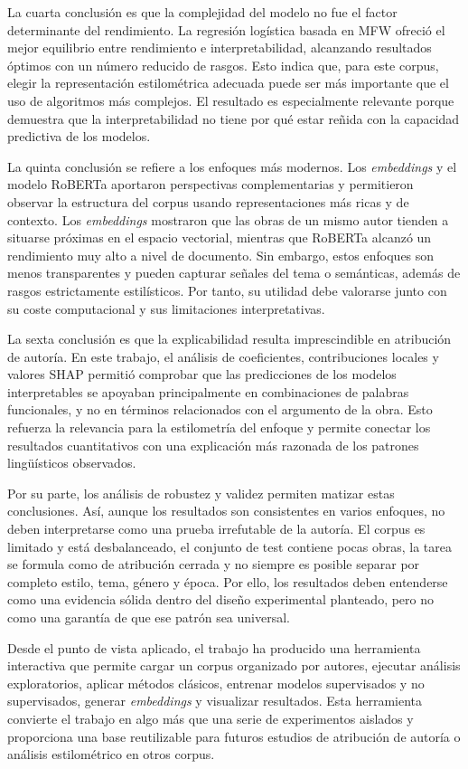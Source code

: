 \documentclass[IB]{TFUOC}%
\begin{document}
La cuarta conclusión es que la complejidad del modelo no fue el factor determinante del rendimiento. La regresión logística basada en MFW ofreció el mejor equilibrio entre rendimiento e interpretabilidad, alcanzando resultados óptimos con un número reducido de rasgos. Esto indica que, para este corpus, elegir la representación estilométrica adecuada puede ser más importante que el uso de algoritmos más complejos. El resultado es especialmente relevante porque demuestra que la interpretabilidad no tiene por qué estar reñida con la capacidad predictiva de los modelos.

La quinta conclusión se refiere a los enfoques más modernos. Los \textit{embeddings} y el modelo RoBERTa aportaron perspectivas complementarias y permitieron observar la estructura del corpus usando representaciones más ricas y de contexto. Los \textit{embeddings} mostraron que las obras de un mismo autor tienden a situarse próximas en el espacio vectorial, mientras que RoBERTa alcanzó un rendimiento muy alto a nivel de documento. Sin embargo, estos enfoques son menos transparentes y pueden capturar señales del tema o semánticas, además de rasgos estrictamente estilísticos. Por tanto, su utilidad debe valorarse junto con su coste computacional y sus limitaciones interpretativas.

La sexta conclusión es que la explicabilidad resulta imprescindible en atribución de autoría. En este trabajo, el análisis de coeficientes, contribuciones locales y valores SHAP permitió comprobar que las predicciones de los modelos interpretables se apoyaban principalmente en combinaciones de palabras funcionales, y no en términos relacionados con el argumento de la obra. Esto refuerza la relevancia para la estilometría del enfoque y permite conectar los resultados cuantitativos con una explicación más razonada de los patrones lingüísticos observados.

Por su parte, los análisis de robustez y validez permiten matizar estas conclusiones. Así, aunque los resultados son consistentes en varios enfoques, no deben interpretarse como una prueba irrefutable de la autoría. El corpus es limitado y está desbalanceado, el conjunto de test contiene pocas obras, la tarea se formula como de atribución cerrada y no siempre es posible separar por completo estilo, tema, género y época. Por ello, los resultados deben entenderse como una evidencia sólida dentro del diseño experimental planteado, pero no como una garantía de que ese patrón sea universal.

Desde el punto de vista aplicado, el trabajo ha producido una herramienta interactiva que permite cargar un corpus organizado por autores, ejecutar análisis exploratorios, aplicar métodos clásicos, entrenar modelos supervisados y no supervisados, generar \textit{embeddings} y visualizar resultados. Esta herramienta convierte el trabajo en algo más que una serie de experimentos aislados y proporciona una base reutilizable para futuros estudios de atribución de autoría o análisis estilométrico en otros corpus.
\end{document}
